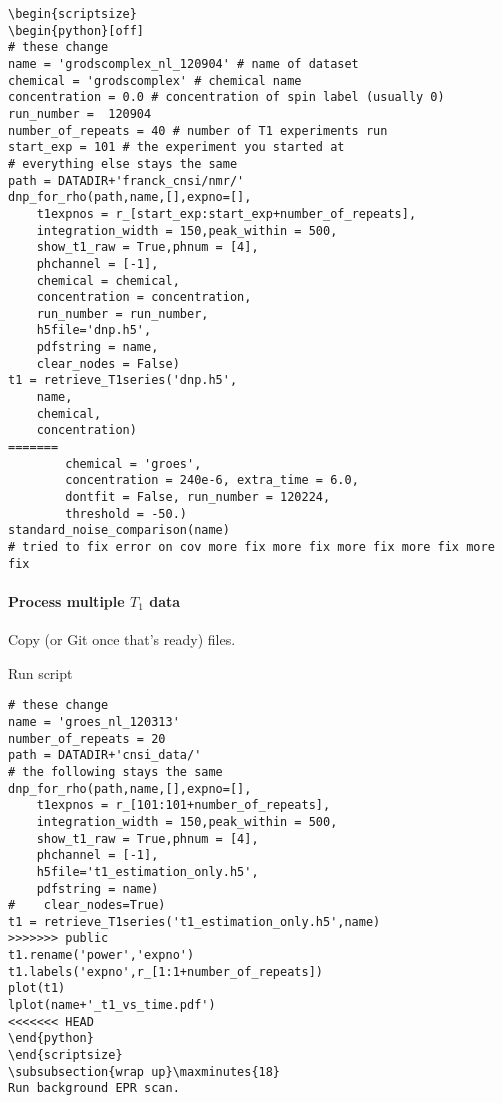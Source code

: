 \begin{scriptsize}
\begin{python}[off]
\begin{scriptsize}
\begin{lstlisting}
\begin{scriptsize}
\begin{python}[off]
# these change
name = 'grodscomplex_nl_120904' # name of dataset
chemical = 'grodscomplex' # chemical name
concentration = 0.0 # concentration of spin label (usually 0)
run_number =  120904
number_of_repeats = 40 # number of T1 experiments run
start_exp = 101 # the experiment you started at
# everything else stays the same
path = DATADIR+'franck_cnsi/nmr/'
dnp_for_rho(path,name,[],expno=[],
    t1expnos = r_[start_exp:start_exp+number_of_repeats],
    integration_width = 150,peak_within = 500,
    show_t1_raw = True,phnum = [4],
    phchannel = [-1],
    chemical = chemical,
    concentration = concentration,
    run_number = run_number,
    h5file='dnp.h5',
    pdfstring = name,
    clear_nodes = False)
t1 = retrieve_T1series('dnp.h5',
    name,
    chemical,
    concentration)
=======
        chemical = 'groes',
        concentration = 240e-6, extra_time = 6.0,
        dontfit = False, run_number = 120224,
        threshold = -50.)
standard_noise_comparison(name)
# tried to fix error on cov more fix more fix more fix more fix more fix
\end{lstlisting}
\end{scriptsize}

\paragraph{Process multiple $T_1$ data}
Copy (or Git once that's ready) files.

Run script

\begin{scriptsize}
\begin{lstlisting}
# these change
name = 'groes_nl_120313'
number_of_repeats = 20
path = DATADIR+'cnsi_data/'
# the following stays the same
dnp_for_rho(path,name,[],expno=[],
    t1expnos = r_[101:101+number_of_repeats],
    integration_width = 150,peak_within = 500,
    show_t1_raw = True,phnum = [4],
    phchannel = [-1],
    h5file='t1_estimation_only.h5',
    pdfstring = name)
#    clear_nodes=True)
t1 = retrieve_T1series('t1_estimation_only.h5',name)
>>>>>>> public
t1.rename('power','expno')
t1.labels('expno',r_[1:1+number_of_repeats])
plot(t1)
lplot(name+'_t1_vs_time.pdf')
<<<<<<< HEAD
\end{python}
\end{scriptsize}
\subsubsection{wrap up}\maxminutes{18}
Run background EPR scan.


\end{lstlisting}
\end{scriptsize}
\end{python}
\end{scriptsize}
